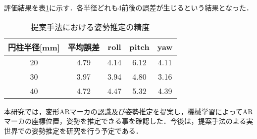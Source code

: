 \documentclass{jsarticle}
\begin{document}
評価結果を表\ref{hyouka}に示す．各半径どれも4前後の誤差が生じるという結果となった．




\begin{table}[h]
        \vspace{0zh}
          \begin{center}
            \caption{提案手法における姿勢推定の精度}
            \label{hyouka}
            \begin{tabular}{c|c|c|c|c} \hline
              円柱半径[mm]   &平均誤差& roll& pitch & yaw \\ \hline
              20&4.79& 4.14 & 6.12 & 4.11 \\ \hline
              30& 3.97&3.94 & 4.80 & 3.16 \\ \hline
              40&4.72 &4.47 &5.32  &4.39 \\ \hline
              \end{tabular}
          \end{center}
        \vspace{-1.0zh}
\end{table}






本研究では，変形ARマーカの認識及び姿勢推定を提案し，機械学習によってARマーカの座標位置，姿勢を推定できる事を確認した．今後は，提案手法のよる実世界での姿勢推定を研究を行う予定である．
\end{document}
